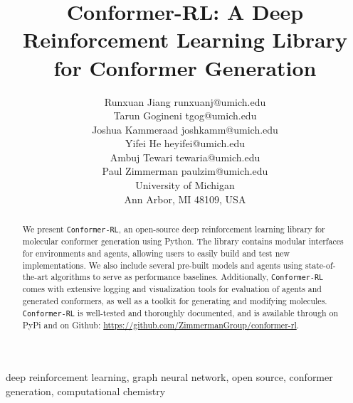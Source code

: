 \documentclass[twoside,11pt]{article}
\newcommand{\code}[1]{\texttt{#1}}
\newcommand{\titleofpaper}{Conformer-RL}
\newcommand{\genComment}[2]{\ifnum\comments=1{\color{#1}{\textsf{\footnotesize #2}}}\fi}
\newcommand{\ambuj}[1] {\genComment{red}{[AT: #1]}}
\begin{document}
\title{\titleofpaper: A Deep Reinforcement Learning Library for Conformer Generation}

\author{\name Runxuan Jiang \email runxuanj@umich.edu \\
       \name Tarun Gogineni \email tgog@umich.edu \\
       \name Joshua Kammeraad \email joshkamm@umich.edu\\
       \name  Yifei He \email heyifei@umich.edu \\
       \name Ambuj Tewari \email tewaria@umich.edu\\
       \name Paul Zimmerman \email paulzim@umich.edu\\
       \addr
       University of Michigan\\
       Ann Arbor, MI 48109, USA} 

\maketitle


\begin{abstract}%
  We present \code{\titleofpaper}, an open-source deep reinforcement learning library for molecular conformer generation using Python. The library contains modular interfaces for environments and agents, allowing users to easily build and test new implementations. We also include several pre-built models and agents using state-of-the-art algorithms to serve as performance baselines. Additionally, \code{\titleofpaper} comes with extensive logging and visualization tools for evaluation of agents and generated conformers, as well as a toolkit for generating and modifying molecules. \code{\titleofpaper} is well-tested and thoroughly documented, and is available through on PyPi and on Github: \url{https://github.com/ZimmermanGroup/conformer-rl}.
\end{abstract}

\begin{keywords}
  deep reinforcement learning, graph neural network, open source, conformer generation, computational chemistry
\end{keywords}

\end{document}
